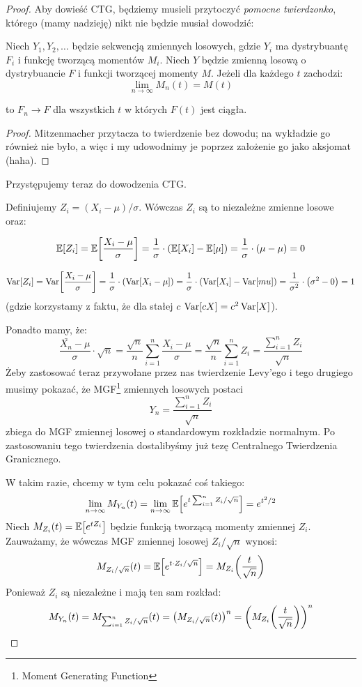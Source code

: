 \begin{proof}
	Aby dowieść CTG, będziemy musieli przytoczyć \textit{pomocne twierdzonko}, którego (mamy nadzieję) nikt nie będzie musiał dowodzić:

	\begin{theorem} Niech \( Y_1, Y_2, \dots\)
		będzie sekwencją zmiennych losowych, gdzie \(Y_i\) ma dystrybuantę \(F_i\) i funkcję tworzącą momentów \( M_i\). Niech \(Y\) będzie zmienną losową o dystrybuancie \(F\) i funkcji tworzącej momenty \(M\). Jeżeli dla każdego \(t\) zachodzi:
		\[
			\lim_{n \to \infty}M_n(t) = M(t)
		\]

		to \(F_n \to F\) dla wszystkich \(t\) w których \( F(t)\) jest ciągła.
	\end{theorem}
	\begin{proof}
		Mitzenmacher przytacza to twierdzenie bez dowodu; na wykładzie go również nie było, a więc i my udowodnimy je poprzez założenie go jako aksjomat (haha).
	\end{proof}

	Przystępujemy teraz do dowodzenia CTG.

	Definiujemy \( Z_i = (X_i - \mu)/\sigma \).
	Wówczas \( Z_i\) są to niezależne zmienne losowe oraz:

	\[
		\expected{Z_i} = \expected{\frac{X_i - \mu}{ \sigma}} = \frac{1}{\sigma} \cdot \pars{\expected{X_i} - \expected{\mu}} = \frac{1}{\sigma} \cdot \pars{\mu - \mu} = 0
	\]

	\[
		\variance{Z_i} = \variance{\frac{X_i - \mu}{\sigma}} = \frac{1}{\sigma} \cdot \pars{\variance{X_i - \mu}} = \frac{1}{\sigma} \cdot \pars{\variance{X_i} - \variance{mu}} = \frac{1}{\sigma^2} \cdot \pars{\sigma^2 - 0} = 1
	\]
	(gdzie korzystamy z faktu, że dla stałej \(c\) \( \variance{cX} = c^2 \variance{X} \)).

	Ponadto mamy, że:
	\[
		\frac{\bar{X_n} - \mu}{\sigma} \cdot \sqrt{n} = \frac{\sqrt{n}}{n}\sum_{i=1}^{n}\frac{X_i-\mu}{\sigma} = \frac{\sqrt{n}}{n} \sum_{i=1}^{n} Z_i = \frac{\sum_{i=1}^nZ_i}{\sqrt{n}}
	\]
	Żeby zastosować teraz przywołane przez nas twierdzenie Levy'ego i tego drugiego musimy pokazać, że MGF\footnote{Moment Generating Function} zmiennych losowych postaci
	\[
		Y_n = \frac{\sum_{i=1}^nZ_i}{\sqrt{n}}
	\]
	zbiega do MGF zmiennej losowej o standardowym rozkładzie normalnym. Po zastosowaniu tego twierdzenia dostalibyśmy już tezę Centralnego Twierdzenia Granicznego.

	W takim razie, chcemy w tym celu pokazać coś takiego:
	\[
		\lim_{n \to \infty} M_{Y_n}(t) = \lim_{n \to \infty}\expected{e^{t\sum_{i=1}^nZ_i/\sqrt{n}}} = e^{t^2/2}
	\]
	Niech \( M_{Z_i}(t) = \expected{e^{tZ_i}} \) będzie funkcją tworzącą momenty zmiennej \(Z_i\).  Zauważamy, że wówczas MGF zmiennej losowej \( Z_i/\sqrt{n}\) wynosi:
	\[
		M_{Z_i / \sqrt{n}}(t) = \expected{e^{t \cdot Z_i/\sqrt{n}}} = M_{Z_i} \pars{\frac{t}{\sqrt{n}}}
	\]
	Ponieważ \( Z_i\) są niezależne i mają ten sam rozkład:
	\[
		M_{Y_n}(t) = M_{\sum_{i=1}^{n} Z_i / \sqrt{n}} (t) = \pars{M_{Z_i / \sqrt{n}}(t)}^n = \pars{M_{Z_i}\pars{\frac{t}{\sqrt{n}}}}^n
	\]


\end{proof}
